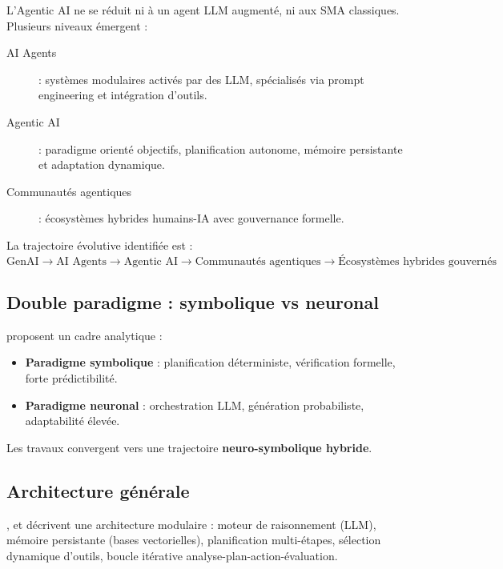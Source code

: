 \documentclass[12pt,a4paper]{report}
\begin{document}
L'Agentic AI ne se réduit ni à un agent LLM augmenté, ni aux SMA classiques.
Plusieurs niveaux émergent \citep{sapkota2024,schneider2025,pati2025} :

\begin{description}
  \item[AI Agents] \citep{sapkota2024} : systèmes modulaires activés par des LLM,
        spécialisés via prompt engineering et intégration d'outils.
  \item[Agentic AI] \citep{schneider2025,pati2025} : paradigme orienté objectifs,
        planification autonome, mémoire persistante et adaptation dynamique.
  \item[Communautés agentiques] \citep{milosevic2026} : écosystèmes hybrides
        humains-IA avec gouvernance formelle.
\end{description}

La trajectoire évolutive identifiée est :
\[ \text{GenAI} \to \text{AI Agents} \to \text{Agentic AI} \to
   \text{Communautés agentiques} \to \text{Écosystèmes hybrides gouvernés} \]

\subsection{Double paradigme : symbolique vs neuronal}

\citet{abouali2026} proposent un cadre analytique :

\begin{itemize}
  \item \textbf{Paradigme symbolique} : planification déterministe, vérification
        formelle, forte prédictibilité.
  \item \textbf{Paradigme neuronal} : orchestration LLM, génération probabiliste,
        adaptabilité élevée.
\end{itemize}

Les travaux convergent vers une trajectoire \textbf{neuro-symbolique hybride}.

\subsection{Architecture générale}

\citet{wavestone2024}, \citet{alvapandey2024} et \citet{vaidhyanathan2026} décrivent
une architecture modulaire : moteur de raisonnement (LLM), mémoire persistante
(bases vectorielles), planification multi-étapes, sélection dynamique d'outils,
boucle itérative analyse-plan-action-évaluation.
\end{document}
